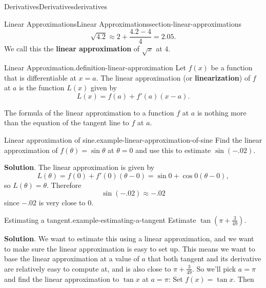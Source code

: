 \documentclass[oneside,10pt,]{book}
\newcommand{\terminology}[1]{\textbf{#1}}
\numberwithin{equation}{section}
\begin{document}
\begin{chapterptx}{Derivatives}{}{Derivatives}{}{}{derivatives}
\begin{sectionptx}{Linear Approximations}{}{Linear Approximations}{}{}{section-linear-approximations}
\begin{equation*}
\sqrt{4.2} \approx 2 + \frac{4.2 - 4}{4} = 2.05.
\end{equation*}
We call this the \terminology{linear approximation} of \(\sqrt{x}\) at \(4\).%
\begin{definition}{Linear Approximation.}{definition-linear-approximation}%
\hypertarget{p-177}{}%
Let \(f(x)\) be a function that is differentiable at \(x=a\). The linear approximation (or \terminology{linearization}) of \(f\) at \(a\) is the function \(L(x)\) given by%
\begin{equation*}
L(x) = f(a) + f'(a)(x-a).
\end{equation*}
%
\end{definition}
\hypertarget{p-178}{}%
The formula of the linear approximation to a function \(f\) at \(a\) is nothing more than the equation of the tangent line to \(f\) at \(a\).%
\begin{example}{Linear approximation of sine.}{example-linear-approximation-of-sine}%
\hypertarget{p-179}{}%
Find the linear approximation of \(f(\theta) = \sin\theta\) at \(\theta=0\) and use this to estimate \(\sin(-.02)\).%
\par\smallskip%
\noindent\textbf{Solution}.\hypertarget{solution-39}{}\quad%
\hypertarget{p-180}{}%
The linear approximation is given by%
\begin{equation*}
L(\theta) = f(0) + f'(0)(\theta - 0) = \sin0 + \cos0 (\theta - 0),
\end{equation*}
so \(L(\theta) = \theta\). Therefore%
\begin{equation*}
\sin(-.02)\approx-.02
\end{equation*}
since \(-.02\) is very close to \(0\).%
\end{example}
\begin{example}{Estimating a tangent.}{example-estimating-a-tangent}%
\hypertarget{p-181}{}%
Estimate \(\tan(\pi+\frac{3}{49})\).%
\par\smallskip%
\noindent\textbf{Solution}.\hypertarget{solution-40}{}\quad%
\hypertarget{p-182}{}%
We want to estimate this using a linear approximation, and we want to make sure the linear approximation is easy to set up. This means we want to base the linear approximation at a value of \(a\) that both tangent and its derivative are relatively easy to compute at, and is also close to \(\pi+\frac{3}{49}\). So we'll pick \(a=\pi\) and find the linear approximation to \(\tan x\) at \(a = \pi\): Set \(f(x) = \tan x\). Then%
\begin{align*}

\end{align*}
\end{example}
\end{sectionptx}
\end{chapterptx}
\end{document}
